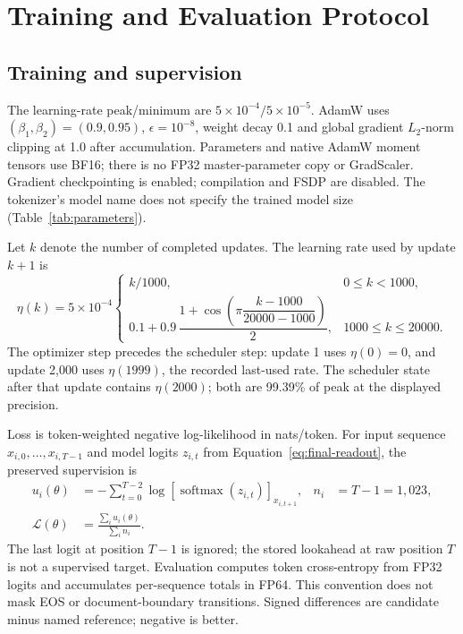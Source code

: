 \documentclass[11pt,letterpaper]{article}
\newcommand{\Loss}{\mathcal{L}}
\newcommand{\LastLRPercent}{99.39}
\begin{document}
\section{Training and Evaluation Protocol}
\label{app:protocol}
\subsection{Training and supervision}
The learning-rate peak/minimum are $5\times10^{-4}/5\times10^{-5}$.
AdamW uses $(\beta_1,\beta_2)=(0.9,0.95)$, $\epsilon=10^{-8}$, weight decay
0.1 and global gradient $L_2$-norm clipping at 1.0 after accumulation.
Parameters and native AdamW moment tensors use BF16; there is no FP32
master-parameter copy or GradScaler. Gradient checkpointing is enabled;
compilation and FSDP are disabled. The tokenizer's model name does not
specify the trained model size (Table~\ref{tab:parameters}).

Let $k$ denote the number of completed updates. The learning rate used by
update $k+1$ is
\begin{equation}
 \eta(k)=5\times10^{-4}
 \begin{cases}
 k/1000,&0\leq k<1000,\\
 0.1+0.9\,\dfrac{1+\cos\!\left(\pi\dfrac{k-1000}{20000-1000}\right)}{2},
   &1000\leq k\leq20000.
 \end{cases}
 \label{eq:lr-schedule}
\end{equation}
The optimizer step precedes the scheduler step: update 1 uses $\eta(0)=0$,
and update 2,000 uses $\eta(1999)$, the recorded last-used rate. The scheduler
state after that update contains $\eta(2000)$; both are \LastLRPercent{}\%
of peak at the displayed precision.

Loss is token-weighted negative log-likelihood in nats/token. For input sequence
$x_{i,0},\ldots,x_{i,T-1}$ and model logits $z_{i,t}$ from
Equation~\ref{eq:final-readout}, the preserved supervision is
\begin{align}
 u_i(\theta)&=-\sum_{t=0}^{T-2}
       \log\!\left[\operatorname{softmax}(z_{i,t})\right]_{x_{i,t+1}},
 &n_i&=T-1=1{,}023,\\
 \Loss(\theta)&=\frac{\sum_i u_i(\theta)}{\sum_i n_i}.
 \label{eq:supervised-loss}
\end{align}
The last logit at position $T-1$ is ignored; the stored lookahead at raw
position $T$ is not a supervised target. Evaluation computes token cross-entropy
from FP32 logits and accumulates per-sequence totals in FP64. This convention
does not mask EOS or document-boundary transitions. Signed differences
are candidate minus named reference; negative is better.
\end{document}
